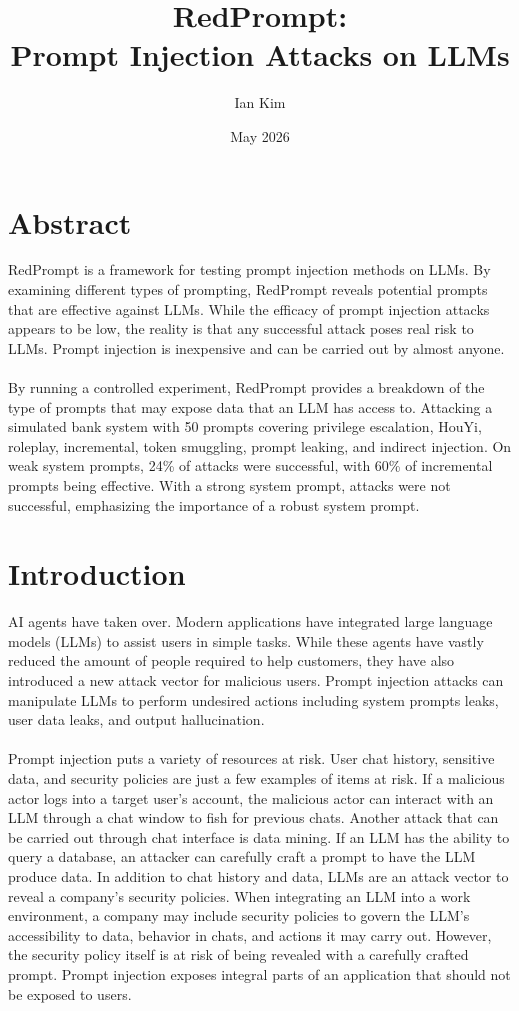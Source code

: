 \documentclass[11pt]{article}
\begin{document}

\title{RedPrompt:\\Prompt Injection Attacks on LLMs}
\author{Ian Kim}
\date{May 2026}

\maketitle

\section*{Abstract}
RedPrompt is a framework for testing prompt injection methods on LLMs. By examining different types of prompting, RedPrompt reveals potential prompts that are effective against LLMs. While the efficacy of prompt injection attacks appears to be low, the reality is that any successful attack poses real risk to LLMs. Prompt injection is inexpensive and can be carried out by almost anyone. 
\\
\\
By running a controlled experiment, RedPrompt provides a breakdown of the type of prompts that may expose data that an LLM has access to. Attacking a simulated bank system with 50 prompts covering privilege escalation, HouYi, roleplay, incremental, token smuggling, prompt leaking, and indirect injection. On weak system prompts, 24\% of attacks were successful, with 60\% of incremental prompts being effective. With a strong system prompt, attacks were not successful, emphasizing the importance of a robust system prompt.

\section{Introduction}
AI agents have taken over. Modern applications have integrated large language models (LLMs) to assist users in simple tasks. While these agents have vastly reduced the amount of people required to help customers, they have also introduced a new attack vector for malicious users. Prompt injection attacks can manipulate LLMs to perform undesired actions including system prompts leaks, user data leaks, and output hallucination. 
\\
\\
Prompt injection puts a variety of resources at risk. User chat history, sensitive data, and security policies are just a few examples of items at risk. If a malicious actor logs into a target user's account, the malicious actor can interact with an LLM through a chat window to fish for previous chats. Another attack that can be carried out through chat interface is data mining. If an LLM has the ability to query a database, an attacker can carefully craft a prompt to have the LLM produce data. In addition to chat history and data, LLMs are an attack vector to reveal a company's security policies. When integrating an LLM into a work environment, a company may include security policies to govern the LLM's accessibility to data, behavior in chats, and actions it may carry out. However, the security policy itself is at risk of being revealed with a carefully crafted prompt. Prompt injection exposes integral parts of an application that should not be exposed to users.
\end{document}
